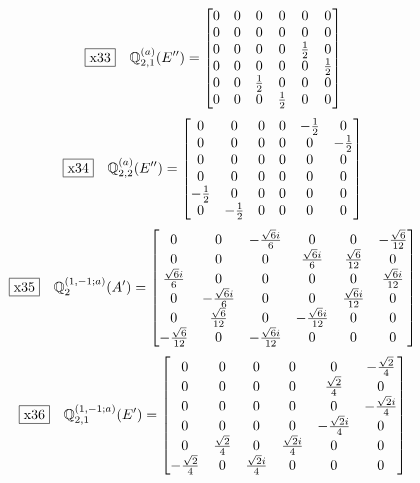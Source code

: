 \documentclass[fleqn,10pt,landscape]{jsarticle}
\begin{document}
\begin{dmath*}
\fbox{x33}\quad \mathbb{Q}_{2,1}^{(a)}(E^{\prime\prime})=\begin{bmatrix} 0 & 0 & 0 & 0 & 0 & 0 \\ 0 & 0 & 0 & 0 & 0 & 0 \\ 0 & 0 & 0 & 0 & \frac{1}{2} & 0 \\ 0 & 0 & 0 & 0 & 0 & \frac{1}{2} \\ 0 & 0 & \frac{1}{2} & 0 & 0 & 0 \\ 0 & 0 & 0 & \frac{1}{2} & 0 & 0 \end{bmatrix}
\end{dmath*}
\begin{dmath*}
\fbox{x34}\quad \mathbb{Q}_{2,2}^{(a)}(E^{\prime\prime})=\begin{bmatrix} 0 & 0 & 0 & 0 & - \frac{1}{2} & 0 \\ 0 & 0 & 0 & 0 & 0 & - \frac{1}{2} \\ 0 & 0 & 0 & 0 & 0 & 0 \\ 0 & 0 & 0 & 0 & 0 & 0 \\ - \frac{1}{2} & 0 & 0 & 0 & 0 & 0 \\ 0 & - \frac{1}{2} & 0 & 0 & 0 & 0 \end{bmatrix}
\end{dmath*}
\begin{dmath*}
\fbox{x35}\quad \mathbb{Q}_{2}^{(1,-1;a)}(A^{\prime})=\begin{bmatrix} 0 & 0 & - \frac{\sqrt{6} i}{6} & 0 & 0 & - \frac{\sqrt{6}}{12} \\ 0 & 0 & 0 & \frac{\sqrt{6} i}{6} & \frac{\sqrt{6}}{12} & 0 \\ \frac{\sqrt{6} i}{6} & 0 & 0 & 0 & 0 & \frac{\sqrt{6} i}{12} \\ 0 & - \frac{\sqrt{6} i}{6} & 0 & 0 & \frac{\sqrt{6} i}{12} & 0 \\ 0 & \frac{\sqrt{6}}{12} & 0 & - \frac{\sqrt{6} i}{12} & 0 & 0 \\ - \frac{\sqrt{6}}{12} & 0 & - \frac{\sqrt{6} i}{12} & 0 & 0 & 0 \end{bmatrix}
\end{dmath*}
\begin{dmath*}
\fbox{x36}\quad \mathbb{Q}_{2,1}^{(1,-1;a)}(E^{\prime})=\begin{bmatrix} 0 & 0 & 0 & 0 & 0 & - \frac{\sqrt{2}}{4} \\ 0 & 0 & 0 & 0 & \frac{\sqrt{2}}{4} & 0 \\ 0 & 0 & 0 & 0 & 0 & - \frac{\sqrt{2} i}{4} \\ 0 & 0 & 0 & 0 & - \frac{\sqrt{2} i}{4} & 0 \\ 0 & \frac{\sqrt{2}}{4} & 0 & \frac{\sqrt{2} i}{4} & 0 & 0 \\ - \frac{\sqrt{2}}{4} & 0 & \frac{\sqrt{2} i}{4} & 0 & 0 & 0 \end{bmatrix}
\end{dmath*}
\end{document}
